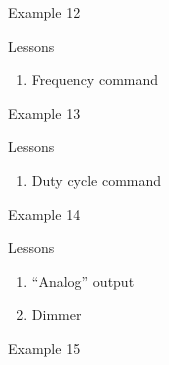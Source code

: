 \begin{frame}{Example 12}



\end{frame}

\begin{frame}{Lessons}

\begin{enumerate}
\def\labelenumi{\arabic{enumi}.}
\tightlist
\item
  Frequency command
\end{enumerate}

\end{frame}

\begin{frame}{Example 13}



\end{frame}

\begin{frame}{Lessons}

\begin{enumerate}
\def\labelenumi{\arabic{enumi}.}
\tightlist
\item
  Duty cycle command
\end{enumerate}

\end{frame}

\begin{frame}{Example 14}



\end{frame}

\begin{frame}{Lessons}

\begin{enumerate}
\def\labelenumi{\arabic{enumi}.}
\tightlist
\item
  ``Analog'' output
\item
  Dimmer
\end{enumerate}

\end{frame}

\begin{frame}{Example 15}



\end{frame}

